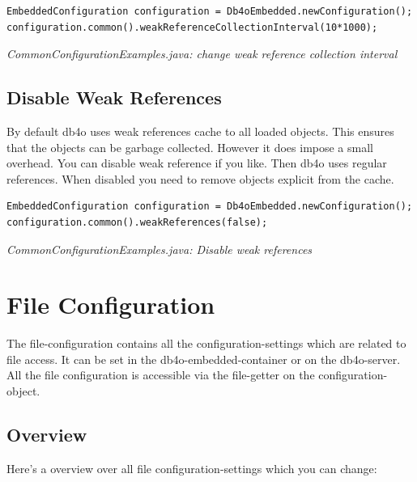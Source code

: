 \begin{lstlisting}
EmbeddedConfiguration configuration = Db4oEmbedded.newConfiguration();
configuration.common().weakReferenceCollectionInterval(10*1000);
\end{lstlisting}

{\small\itshape CommonConfigurationExamples.java: change weak reference collection interval\par}
\medskip

\subsection{Disable Weak References}
\label{ref:configuration-common-disable-weak-references}

By default db4o uses weak references cache to all loaded objects. This ensures that the objects can be garbage collected. However it does impose a small overhead. You can disable weak reference if you like. Then db4o uses regular references. When disabled you need to remove objects explicit from the cache.

\begin{lstlisting}
EmbeddedConfiguration configuration = Db4oEmbedded.newConfiguration();
configuration.common().weakReferences(false);
\end{lstlisting}

{\small\itshape CommonConfigurationExamples.java: Disable weak references\par}
\medskip

\section{File Configuration}
\label{ref:configuration-file-configuration}

The file-configuration contains all the configuration-settings which are related to file access. It can be set in the db4o-embedded-container or on the db4o-server. All the file configuration is accessible via the file-getter on the configuration-object.

\subsection*{Overview}

Here's a overview over all file configuration-settings which you can change:


